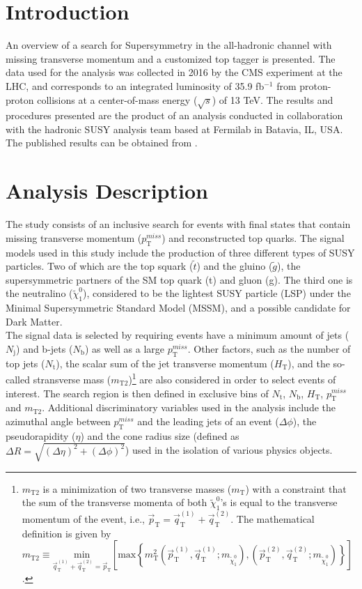 \section{Introduction}

An overview of a search for Supersymmetry in the all-hadronic channel with missing transverse momentum and a customized top tagger is presented. The data used for the analysis was collected in 2016 by the CMS experiment at the LHC, and corresponds to an integrated luminosity of 35.9 fb$^{-1}$ from proton-proton collisions at a center-of-mass energy ($\sqrt{s}$) of 13 TeV. The results and procedures presented are the product of an analysis conducted in collaboration with the hadronic SUSY analysis team based at Fermilab in Batavia, IL, USA. The published results can be obtained from \cite{SUSYanalysis}.

\section{Analysis Description}

The study consists of an inclusive search for events with final states that contain missing transverse momentum ($p_{\text{T}}^{miss}$) and reconstructed top quarks. The signal models used in this study include the production of three different types of SUSY particles. Two of which are the top squark ($\tilde{t}$) and the gluino ($\tilde{g}$), the supersymmetric partners of the SM top quark (t) and gluon (g). The third one is the neutralino ($\tilde{\chi}_{1}^{0}$), considered to be the lightest SUSY particle (LSP) under the Minimal Supersymmetric Standard Model (MSSM)\cite{MSSM,MSSM2}, and a possible candidate for Dark Matter\cite{WIMP}.\\

The signal data is selected by requiring events have a minimum amount of jets ($N_\text{j}$) and b-jets ($N_\text{b}$) as well as a large $p_{\text{T}}^{miss}$. Other factors, such as the number of top jets ($N_\text{t}$), the scalar sum of the jet transverse momentum ($H_\text{T}$), and the so-called stransverse mass ($m_\text{T2}$)\footnote{$m_\text{T2}$ is a minimization of two transverse masses ($m_\text{T}$) with a constraint that the sum of the transverse momenta of both $\tilde{\chi}_{1}^{0}$'s is equal to the transverse momentum of the event, i.e., $\vec{p}_\text{T} = \vec{q}_\text{T}^{(1)} + \vec{q}_\text{T}^{(2)}$. The mathematical definition is given by $m_\text{T2} \equiv \underset{\vec{q}_\text{T}^{(1)} + \vec{q}_\text{T}^{(2)} = \vec{p}_\text{T}}{\text{min}}\left [ \text{max}\left \{ m_\text{T}^2 (\vec{p}_\text{T}^{(1)}, \vec{q}_\text{T}^{(1)}; m_{\tilde{\chi}_{1}^{0}}), (\vec{p}_\text{T}^{(2)}, \vec{q}_\text{T}^{(2)}; m_{\tilde{\chi}_{1}^{0}}) \right \} \right ]$.} are also considered in order to select events of interest. The search region is then defined in exclusive bins of $N_\text{t}$, $N_\text{b}$, $H_\text{T}$, $p_{\text{T}}^{miss}$ and $m_\text{T2}$. Additional discriminatory variables used in the analysis include the azimuthal angle between $p_{\text{T}}^{miss}$ and the leading jets of an event ($\Delta\phi$), the pseudorapidity ($\eta$) and the cone radius size (defined as $\Delta R = \sqrt{(\Delta\eta)^2+(\Delta\phi)^2}$) used in the isolation of various physics objects.

